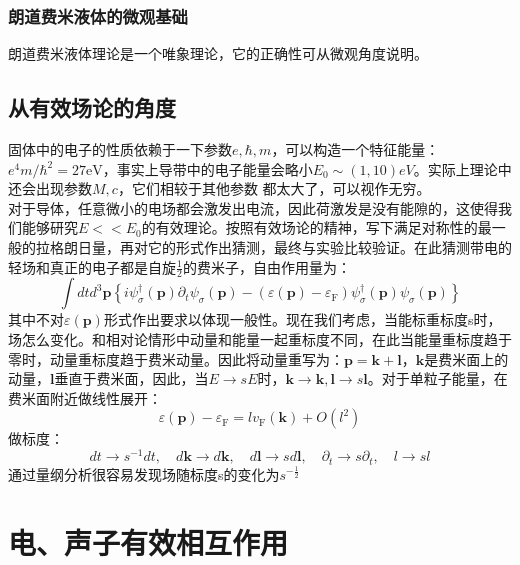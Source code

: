 \documentclass[10pt,openany]{book}
\theoremstyle{thmstyle} %
\theoremstyle{defstyle} %
\theoremstyle{prostyle} %
\begin{document}
\subsubsection{朗道费米液体的微观基础}
朗道费米液体理论是一个唯象理论，它的正确性可从微观角度说明。
\subsection{从有效场论的角度}
固体中的电子的性质依赖于一下参数$ e,\hbar,m $，可以构造一个特征能量：$ e^4 m / \hbar^2=27 \mathrm{eV} $，事实上导带中的电子能量会略小$ E_0\sim(1,10)eV $。实际上理论中还会出现参数$ M,c $，它们相较于其他参数
都太大了，可以视作无穷。\\
对于导体，任意微小的电场都会激发出电流，因此荷激发是没有能隙的，这使得我们能够研究$ E<<E_0 $的有效理论。按照有效场论的精神，写下满足对称性的最一般的拉格朗日量，再对它的形式作出猜测，最终与实验比较验证。在此猜测带电的轻场和真正的电子都是自旋$ \frac{1}{2} $的费米子，自由作用量为：
\begin{equation}
	\int d t d^3 \mathbf{p}\left\{i \psi_\sigma^{\dagger}(\mathbf{p}) \partial_t \psi_\sigma(\mathbf{p})-\left(\varepsilon(\mathbf{p})-\varepsilon_{\mathrm{F}}\right) \psi_\sigma^{\dagger}(\mathbf{p}) \psi_\sigma(\mathbf{p})\right\}
\end{equation}     
其中不对$ \varepsilon(\mathbf{p}) $形式作出要求以体现一般性。现在我们考虑，当能标重标度s时，场怎么变化。和相对论情形中动量和能量一起重标度不同，在此当能量重标度趋于零时，动量重标度趋于费米动量。因此将动量重写为：$ \mathbf{p}=\mathbf{k}+\mathbf{l} $，$ \mathbf{k} $是费米面上的动量，$ \mathbf{l} $垂直于费米面，因此，当$ E\to sE $时，$ \mathbf{k}\to\mathbf{k},\mathbf{l}\to s\mathbf{l} $。对于单粒子能量，在费米面附近做线性展开：
\begin{equation}
	\varepsilon(\mathbf{p})-\varepsilon_{\mathrm{F}}=l v_{\mathrm{F}}(\mathbf{k})+O\left(l^2\right)
\end{equation} 
做标度：
\begin{equation}
	d t \rightarrow s^{-1} d t, \quad d \mathbf{k} \rightarrow d \mathbf{k}, \quad d \mathbf{l} \rightarrow s d \mathbf{l}, \quad \partial_t \rightarrow s \partial_t, \quad l \rightarrow s l
\end{equation}    
通过量纲分析很容易发现场随标度s的变化为$ s^{-\frac{1}{2}} $ 
\section{电、声子有效相互作用}
\end{document}
